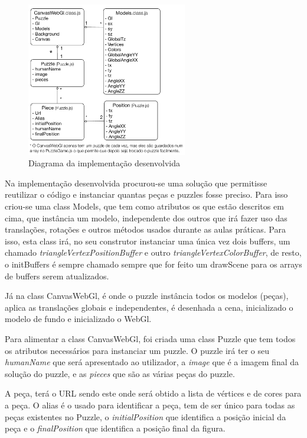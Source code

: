 \documentclass[pdftex,12pt,a4paper]{report}
\begin{document}
\begin{figure}[!htb]
\center
 \includegraphics[width=70mm,scale=1]{classes.pdf}
 \caption{Diagrama da implementação desenvolvida}
 \label{fig:decifra_livro}
\end{figure}

Na implementação desenvolvida procurou-se uma solução que permitisse reutilizar o código e instanciar quantas peças e puzzles fosse preciso. Para isso criou-se uma class Models, que tem como atributos os que estão descritos em cima, que instância um modelo, independente dos outros que irá fazer uso das translações, rotações e outros métodos usados durante as aulas práticas. Para isso, esta class irá, no seu construtor instanciar uma única vez dois buffers, um chamado \textit{triangleVertexPositionBuffer} e outro  \textit{triangleVertexColorBuffer}, de resto, o initBuffers é sempre chamado sempre que for feito um drawScene para os arrays de buffers serem atualizados.

Já na class CanvasWebGl, é onde o puzzle instância todos os modelos (peças), aplica as translações globais e independentes, é desenhada a cena, inicializado o modelo de fundo e inicializado o WebGl. 

Para alimentar a class CanvasWebGl, foi criada uma class Puzzle que tem todos os atributos necessários para instanciar um puzzle. O puzzle irá ter o seu \textit{humanName} que será apresentado ao utilizador, a \textit{image} que é a imagem final da solução do puzzle, e as \textit{pieces} que são as várias peças do puzzle.

A peça, terá o URL sendo este onde será obtido a lista de vértices e de cores para a peça. O alias é o usado para identificar a peça, tem de ser único para todas as peças existentes no Puzzle, o \textit{initialPosition} que identifica a posição inicial da peça e o \textit{finalPosition} que identifica a posição final da figura.
\end{document}
